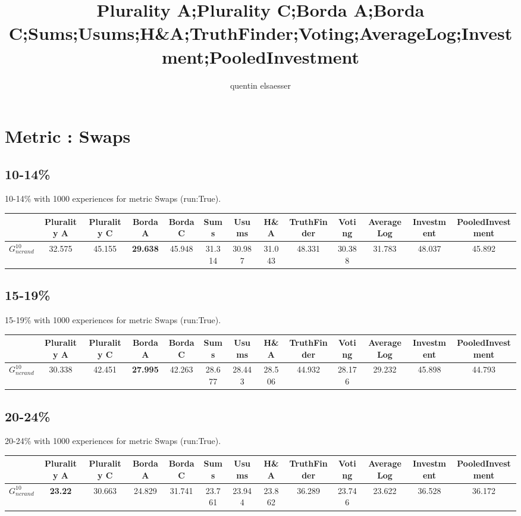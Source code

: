 \documentclass{article}
\author{quentin elsaesser}
\title{Plurality A;Plurality C;Borda A;Borda C;Sums;Usums;H\&A;TruthFinder;Voting;AverageLog;Investment;PooledInvestment}
\newcommand{\graph}[2]{$G_{#1}^{#2}$}
\begin{document}
\newpage

\newpage
\section{Metric : Swaps}

\newpage

\subsection{10-14\%}

10-14\% with 1000 experiences for metric Swaps (run:True).

\noindent\begin{tabular}{|l|c|c|c|c|c|c|c|c|c|c|c|c|}
\hline
& Plurality A& Plurality C& Borda A& Borda C& Sums& Usums& H\&A& TruthFinder& Voting& AverageLog& Investment& PooledInvestment\\
\hline
\graph{ncrand}{10} &32.575&45.155&\textbf{29.638}&45.948&31.314&30.987&31.043&48.331&30.388&31.783&48.037&45.892\\
\hline
\end{tabular}
\newpage

\subsection{15-19\%}

15-19\% with 1000 experiences for metric Swaps (run:True).

\noindent\begin{tabular}{|l|c|c|c|c|c|c|c|c|c|c|c|c|}
\hline
& Plurality A& Plurality C& Borda A& Borda C& Sums& Usums& H\&A& TruthFinder& Voting& AverageLog& Investment& PooledInvestment\\
\hline
\graph{ncrand}{10} &30.338&42.451&\textbf{27.995}&42.263&28.677&28.443&28.506&44.932&28.176&29.232&45.898&44.793\\
\hline
\end{tabular}
\newpage

\subsection{20-24\%}

20-24\% with 1000 experiences for metric Swaps (run:True).

\noindent\begin{tabular}{|l|c|c|c|c|c|c|c|c|c|c|c|c|}
\hline
& Plurality A& Plurality C& Borda A& Borda C& Sums& Usums& H\&A& TruthFinder& Voting& AverageLog& Investment& PooledInvestment\\
\hline
\graph{ncrand}{10} &\textbf{23.22}&30.663&24.829&31.741&23.761&23.944&23.862&36.289&23.746&23.622&36.528&36.172\\
\hline
\end{tabular}
\newpage
\end{document}
